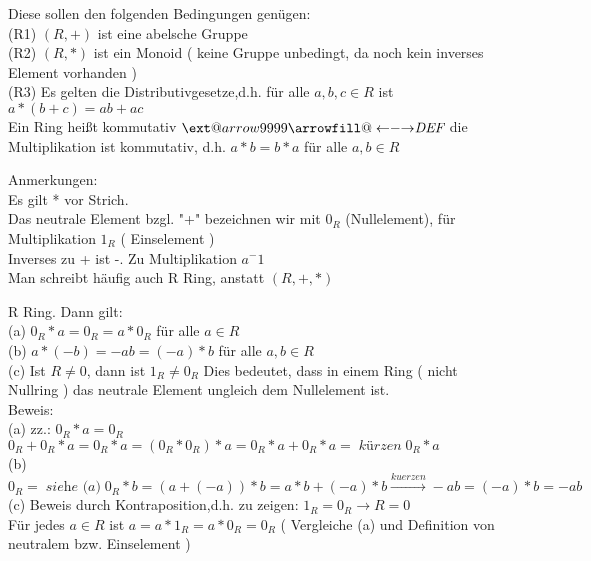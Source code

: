 \documentclass[headsepline,12pt,a4paper]{scrartcl}
\makeatletter
\newcommand\xleftrightarrow[2][]{%
  \ext@arrow 9999{\longleftrightarrowfill@}{#1}{#2}}
\newcommand\longleftrightarrowfill@{%
  \arrowfill@\leftarrow\relbar\rightarrow}
\makeatother
\begin{document}
Diese sollen den folgenden Bedingungen genügen: \\
(R1) $(R,+)$ ist eine abelsche Gruppe \\
(R2) $ (R,*)$ ist ein Monoid ( keine Gruppe unbedingt, da noch kein inverses Element vorhanden ) \\
(R3) Es gelten die Distributivgesetze,d.h. für alle $a,b,c \in R $ ist \\
$a*(b+c) = ab+ac $ \\

Ein Ring heißt kommutativ $\xleftrightarrow{\textit{DEF}}$ die Multiplikation ist kommutativ, d.h. $a*b = b*a $ für alle $a,b \in R $ \\

\item Anmerkungen:\\
Es gilt * vor Strich.\\
Das neutrale Element bzgl. "+" bezeichnen wir mit $0_R$ (Nullelement), für Multiplikation $1_R$ ( Einselement ) \\
Inverses zu + ist -. Zu Multiplikation $ a^-1$ \\
Man schreibt häufig auch R Ring, anstatt $(R,+,*)$  \\

\item R Ring. Dann gilt:  \\
(a) $0_R * a = 0_R = a * 0_R $ für alle $ a \in R $ \\
(b) $a*(-b) = -ab = (-a)*b$ für alle $ a,b \in R $ \\
(c) Ist $R\neq 0 $, dann ist $1_R \neq 0_R$ Dies bedeutet, dass in einem Ring ( nicht Nullring ) das neutrale Element ungleich dem Nullelement ist.\\

Beweis:\\
(a) zz.:  $0_R * a = 0_R$ \\
$0_R + 0_R * a = 0_R * a = (0_R * 0_R) * a = 0_R * a + 0_R * a = \; \textit{kürzen} \; 0_R * a $ \\
(b) $ 0_R = \; \textit{siehe (a)} \; 0_R * b = (a+(-a)) * b = a*b + (-a )*b \xrightarrow{kuerzen} -ab = (-a)*b =-ab $\\
(c) Beweis durch Kontraposition,d.h. zu zeigen: $1_R = 0_R \rightarrow R = 0 $ \\
Für jedes $ a \in R $ ist $ a = a*1_R = a*0_R = 0_R $ ( Vergleiche (a) und Definition von neutralem bzw. Einselement ) \\
\end{document}
